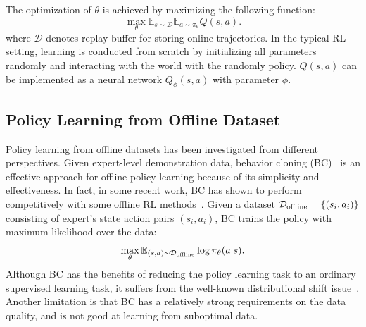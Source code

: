 \documentclass{article}
\begin{document}
The optimization of $\theta$ is achieved by maximizing
the following function:
\begin{equation}\label{eq:policy_update_online}
\max_{\theta} \mathbb{E}_{s\sim \mathcal{D}} \mathbb{E}_{a\sim\pi_{\theta}} Q(s, a).
\end{equation}
where $\mathcal{D}$ denotes replay buffer for storing online trajectories.
In the typical RL setting, learning is conducted from scratch by initializing all
parameters randomly and interacting with the world with the randomly policy.
$Q(s, a)$ can be implemented as   a neural network  $Q_{\phi}(s, a)$ with parameter $\phi$.






\subsection{Policy Learning from Offline Dataset}
Policy learning from offline datasets has been investigated from different perspectives.
Given expert-level demonstration data, behavior cloning (BC)~\citep{ALVINN, bc} is an effective approach for offline policy learning because of its simplicity and effectiveness.
In fact, in some recent work, BC has shown to perform competitively with some offline RL methods~\citep{td3bc, DT}.
Given a dataset $\mathcal{D}_{\rm offline}=\{(s_i, a_i)\}$ consisting of expert's state action pairs $(s_i, a_i)$,
BC trains the policy  with maximum likelihood over the data:
\begin{equation} \label{eq:bc}
    \max_{\theta} \mathbb{E}_{(s, a)\sim \mathcal{D}_{\rm offline}}  \log \pi_{\theta}(a|s).
\end{equation}
Although BC has the benefits of reducing the  policy learning task to an ordinary supervised learning task,
it suffers from the well-known distributional shift issue~\citep{BC_carla, off_road, causal_confusion, copycat}.
Another limitation is that BC has a relatively strong requirements on the data quality, and is not good at learning
from suboptimal data.
\end{document}
